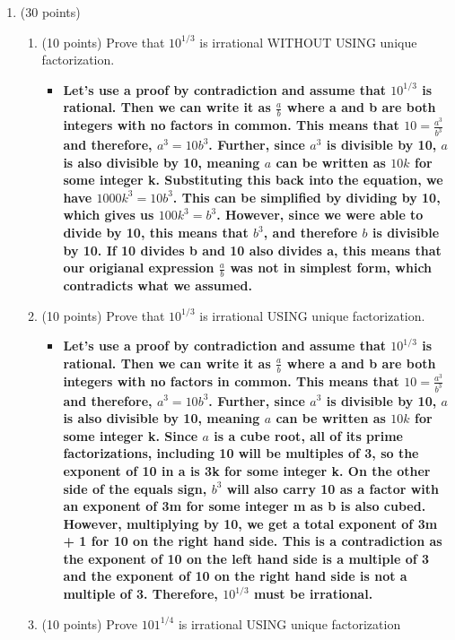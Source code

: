 \documentclass[12pt]{article}
\begin{document}
\begin{enumerate}
\item 
(30 points)
\begin{enumerate}
\item
(10 points)
Prove that $10^{1/3}$ is irrational WITHOUT USING unique factorization. 
\begin{itemize}
    \item \textbf{Let's use a proof by contradiction and assume that $10^{1/3}$ is rational. Then we can write it as $\frac ab$ where a and b are both integers with no factors in common. This means that $10 = \frac {a^3}{b^3}$ and therefore, $a^3 = 10b^3$. Further, since $a^3$ is divisible by 10, $a$ is also divisible by 10, meaning $a$ can be written as $10k$ for some integer k. Substituting this back into the equation, we have $1000k^3 = 10b^3$. This can be simplified by dividing by 10, which gives us $100k^3 = b^3$. However, since we were able to divide by 10, this means that $b^3$, and therefore $b$ is divisible by 10. If 10 divides b and 10 also divides a, this means that our origianal expression $\frac ab$ was not in simplest form, which contradicts what we assumed.}
\end{itemize}
\item
(10 points)
Prove that $10^{1/3}$ is irrational USING unique factorization. 
\begin{itemize}
    \item \textbf{Let's use a proof by contradiction and assume that $10^{1/3}$ is rational. Then we can write it as $\frac ab$ where a and b are both integers with no factors in common. This means that $10 = \frac {a^3}{b^3}$ and therefore, $a^3 = 10b^3$. Further, since $a^3$ is divisible by 10, $a$ is also divisible by 10, meaning $a$ can be written as $10k$ for some integer k. Since $a$ is a cube root, all of its prime factorizations, including 10 will be multiples of 3, so the exponent of 10 in a is 3k for some integer k. On the other side of the equals sign, $b^3$ will also carry 10 as a factor with an exponent of 3m for some integer m as b is also cubed. However, multiplying by 10, we get a total exponent of 3m + 1 for 10 on the right hand side. This is a contradiction as the exponent of 10 on the left hand side is a multiple of 3 and the exponent of 10 on the right hand side is not a multiple of 3. Therefore, $10^{1/3}$ must be irrational.}
\end{itemize}
\item
(10 points)
Prove $101^{1/4}$ is irrational USING unique factorization
\begin{itemize}

\end{itemize}
\end{enumerate}
\end{enumerate}
\end{document}
